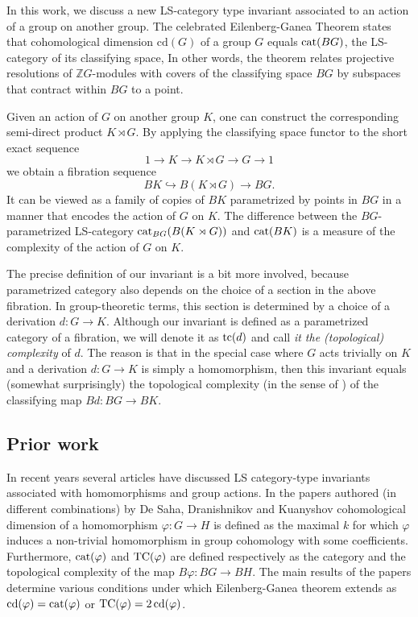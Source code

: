 \documentclass[11pt]{amsart}
\theoremstyle{plain}
\theoremstyle{definition}
\newcommand{\ZZ}{{\mathbb{Z}}}
\newcommand{\cat}{\mathop{\rm cat}\nolimits}
\newcommand{\tc}{\mathop{\rm tc}\nolimits}
\newcommand{\TC}{\mathop{\rm TC}\nolimits}
\newcommand{\cd}{\mathrm{cd}}
\begin{document}
In this work, we discuss a new LS-category type invariant associated to an action
of a group on another group. The celebrated Eilenberg-Ganea Theorem 
\cite{EilenbergGanea1957} states that cohomological dimension $\cd(G)$ of a group $G$ equals $\cat(BG)$,
the LS-category of its classifying space, In other words, the theorem relates projective resolutions of 
$\ZZ G$-modules with covers of the classifying space $BG$ by subspaces that contract within $BG$ to a point. 

Given an action of $G$ on another group $K$,  one can construct the corresponding
semi-direct product $K\rtimes G$. By applying the classifying space functor to the short
exact sequence 
$$1\to K\to K\rtimes G\to G\to 1$$
we obtain a fibration sequence
$$ BK\hookrightarrow B(K\rtimes G) \to BG. $$
It can be viewed as a family of copies of $BK$ parametrized by points in $BG$ in a manner that encodes
the action of $G$ on $K$. 
The difference between the $BG$-parametrized LS-category $\cat_{BG}(B(K\rtimes G))$ and 
$\cat(BK)$ is a measure of the complexity of the action of $G$ on $K$. 

The precise definition of our invariant is a bit more involved, because parametrized category also depends 
on the choice 
of a section in the above fibration. In group-theoretic terms, this section is determined by a choice
of a derivation $d\colon G\to K$. Although our invariant is defined as a parametrized category of a fibration,
we will denote it as $\tc(d)$ and call \emph{it the (topological) complexity} of $d$. The reason is that 
in the special 
case where $G$ acts trivially on $K$ and a derivation $d\colon G\to K$ is simply a homomorphism, 
then this invariant equals (somewhat surprisingly) the topological complexity (in the sense of \cite{Pavesic2019a})
of the classifying map $Bd\colon BG\to BK$.

\subsection{Prior work}

In recent years several articles have  discussed LS category-type invariants associated with homomorphisms 
and group actions. In the papers 
\cite{DranishnikovKuanyshov2023, Kuanyshov2023, Kuanyshov2024a,Kuanyshov2024b,DeSahaDranishnikov2024}
authored (in different combinations) by De Saha, Dranishnikov and Kuanyshov cohomological dimension
of a homomorphism $\varphi \colon G\to H$ is defined as the maximal $k$ for which $\varphi$ induces
a non-trivial homomorphism in group cohomology with some coefficients. Furthermore, $\cat(\varphi)$ and
$\TC(\varphi)$ are defined respectively as the category and the topological complexity of the 
map $B\varphi\colon BG\to BH$. The main results of the papers determine various conditions under which 
Eilenberg-Ganea theorem extends as $\cd(\varphi)=\cat(\varphi)$ or $\TC(\varphi)=2\,\cd(\varphi)$.
\end{document}
